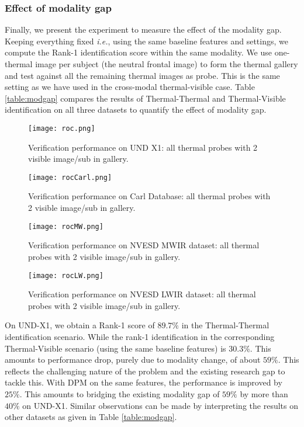 \documentclass[smallextended,natbib]{svjour3}       \usepackage{graphicx}
\newcommand{\ie}{\emph{i.e.}}
\begin{document}
\subsubsection{Effect of modality gap}
Finally, we present the experiment to measure the effect of the modality gap. Keeping everything fixed \ie, using the same baseline features and settings, we compute the Rank-1 identification score within the same modality. We use one-thermal image per subject (the neutral frontal image) to form the thermal gallery and test against all the remaining thermal images as probe. This is the same setting as we have used in the cross-modal thermal-visible case. Table \ref{table:modgap} compares the results of Thermal-Thermal and Thermal-Visible identification on all three datasets to quantify the effect of modality gap.

\begin{figure}
  \begin{minipage}[t]{0.48\textwidth}  
    \texttt{[image: roc.png]}
	\caption{Verification performance on UND X1: all thermal probes with 2 visible image/sub in gallery.}
    \label{fig:7}
  \end{minipage}
  \hfill
  \begin{minipage}[t]{0.48\textwidth}
    \texttt{[image: rocCarl.png]}
\caption{Verification performance on Carl Database: all thermal probes with 2 visible image/sub in gallery.}    
        \label{fig:8}
  \end{minipage}
\end{figure}
\begin{figure}
  \begin{minipage}[t]{0.48\textwidth}  
    \texttt{[image: rocMW.png]}
	\caption{Verification performance on NVESD MWIR dataset: all thermal probes with 2 visible image/sub in gallery.}
    \label{fig:9}
  \end{minipage}
  \hfill
  \begin{minipage}[t]{0.48\textwidth}
    \texttt{[image: rocLW.png]}
\caption{Verification performance on NVESD LWIR dataset: all thermal probes with 2 visible image/sub in gallery.}    
        \label{fig:10}
  \end{minipage}
\end{figure}

On UND-X1, we obtain a Rank-1 score of $89.7\%$ in the Thermal-Thermal identification scenario. While the rank-1 identification in the corresponding Thermal-Visible scenario (using the same baseline features) is $30.3\%$. This amounts to performance drop, purely due to modality change, of about $59\%$. This reflects the challenging nature of the problem and the existing research gap to tackle this. With DPM on the same features, the performance is improved by $25\%$. This amounts to bridging the existing modality gap of $59\%$ by more than $40\%$ on UND-X1. Similar observations can be made by interpreting the results on other datasets as given in Table \ref{table:modgap}.
\end{document}
